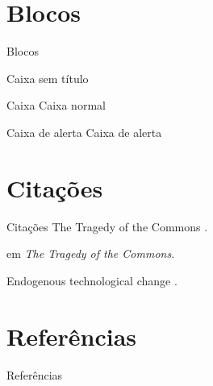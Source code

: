 \documentclass[
    brazil,
    aspectratio=169, %
    ]{beamer}
\begin{document}
\section{Blocos}
\begin{frame}{Blocos}
    \begin{block}{}
        Caixa sem título
    \end{block}
    \begin{block}{Caixa}
        Caixa normal
    \end{block}
    \begin{alertblock}{Caixa de alerta}
        Caixa de alerta
    \end{alertblock}
\end{frame}

\section{Citações}
\begin{frame}{Citações}
    The Tragedy of the Commons \cite{Hardin1968}. \par
     em \textit{The Tragedy of the Commons}. \par
    Endogenous technological change \cite{romer1990endogenous}.
\end{frame}

\section{Referências}
\begin{frame}{Referências}
    \footnotesize
\end{frame}
\end{document}
